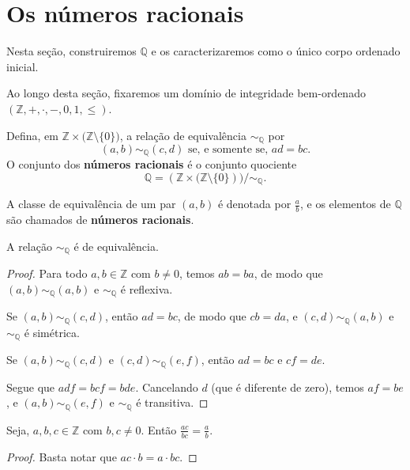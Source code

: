 \section{Os números racionais}

Nesta seção, construiremos $\mathbb Q$ e os caracterizaremos como o único corpo ordenado inicial.

Ao longo desta seção, fixaremos um domínio de integridade bem-ordenado $(\mathbb Z, +, \cdot, -, 0, 1, \leq)$.
\begin{definition}\label{def:conjuntoNumerosRacionais}
Defina, em $\mathbb Z\times\mathbb (\mathbb Z\setminus\{0\})$, a relação de equivalência $\sim_{\mathbb Q}$ por
\[
    (a, b)\sim_{\mathbb Q} (c, d) \text{ se, e somente se, } ad=bc.
\]
O conjunto dos \textbf{números racionais} é o conjunto quociente
\[
    \mathbb Q = (\mathbb Z\times\mathbb (\mathbb Z\setminus\{0\}))/{\sim_{\mathbb Q}}.
\]

A classe de equivalência de um par $(a, b)$ é denotada por $\frac{a}{b}$, e os elementos de $\mathbb Q$ são chamados de \textbf{números racionais}.
\end{definition}

\begin{proposition}
    A relação $\sim_{\mathbb Q}$ é de equivalência.
\end{proposition}
\begin{proof}
    Para todo $a, b\in\mathbb Z$ com $b\neq 0$, temos $ab=ba$, de modo que $(a, b)\sim_{\mathbb Q} (a, b)$ e $\sim_{\mathbb Q}$ é reflexiva.

    Se $(a, b)\sim_{\mathbb Q} (c, d)$, então $ad=bc$, de modo que $cb=da$, e $(c, d)\sim_{\mathbb Q} (a, b)$ e $\sim_{\mathbb Q}$ é simétrica.

    Se $(a, b)\sim_{\mathbb Q} (c, d)$ e $(c, d)\sim_{\mathbb Q} (e, f)$, então $ad=bc$ e $cf=de$.
    
    Segue que $adf=bcf=bde$.
    Cancelando $d$ (que é diferente de zero), temos $af=be$, e $(a, b)\sim_{\mathbb Q} (e, f)$ e $\sim_{\mathbb Q}$ é transitiva.
\end{proof}

\begin{lemma}
    Seja, $a, b, c \in \mathbb Z$ com $b, c\neq 0$.
    Então $\frac{ac}{bc}=\frac{a}{b}$.
\end{lemma}
\begin{proof}
    Basta notar que $ac\cdot b = a\cdot bc$.
\end{proof}

